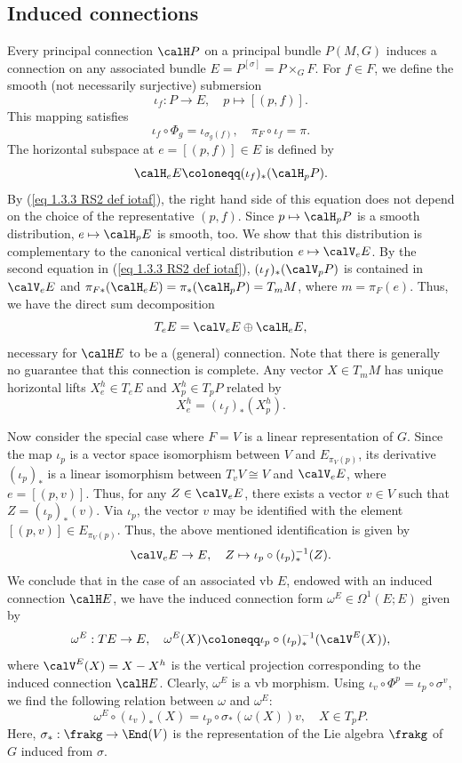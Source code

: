 \subsection{Induced connections}\label{sec: induced connections}


Every principal connection $\calH P$ on a principal bundle $P(M,G)$ induces a connection on any associated bundle $E=P^{[\sigma]}=P\times_G F$. For $f\in F$, we define the smooth (not necessarily surjective) submersion
\[\iota_f:P\to E,\quad p\mapsto [(p,f)].\label{eq 1.3.3 RS2 def iotaf}\]
This mapping satisfies 
\[\iota_f\circ \Phi_g=\iota_{\sigma_g(f)},\quad \pi_F\circ\iota_f=\pi.\]
The horizontal subspace at $e=[(p,f)]\in E$ is defined by
\[\calH_eE\coloneqq (\iota_f)_\ast (\calH_pP).\label{eq 1.3.4 RS2}\]
By (\ref{eq 1.3.3 RS2 def iotaf}), the right hand side of this equation does not depend on the choice of the representative $(p,f)$. Since $p\mapsto \calH_pP$ is a smooth distribution, $e\mapsto \calH_pE$ is smooth, too. We show that this distribution is complementary to the canonical vertical distribution $e\mapsto \calV_eE$. By the second equation in (\ref{eq 1.3.3 RS2 def iotaf}), $(\iota_f)_\ast(\calV_pP)$ is contained in $\calV_eE$ and $\pi_{F\ast}(\calH_eE)=\pi_\ast(\calH_pP)=T_mM$, where $m=\pi_F(e)$. Thus, we have the direct sum decomposition 
\[T_eE=\calV_eE\oplus \calH_eE,\]
necessary for $\calH E$ to be a (general) connection. Note that there is generally no guarantee that this connection is complete. Any vector $X\in T_mM$ has unique horizontal lifts $X_e^h\in T_eE$ and $X_p^h\in T_pP$ related by
\[X^h_e=(\iota_f)_\ast(X^h_p).\label{eq 1.3.5 RS2}\]

Now consider the special case where $F=V$ is a linear representation of $G$. Since the map $\iota_p$ is a vector space isomorphism between $V$ and $E_{\pi_V(p)}$, its derivative $(\iota_p)_\ast$ is a linear isomorphism between $T_vV\cong V$ and $\calV_eE$, where $e=[(p,v)]$. Thus, for any $Z\in \calV_eE$, there exists a vector $v\in V$ such that $Z=(\iota_p)_\ast(v)$. Via $\iota_p$, the vector $v$ may  be identified with the element $[(p,v)]\in E_{\pi_V(p)}$. Thus, the above mentioned identification is given by 
\[\calV_eE\to E,\quad Z\mapsto \iota_p\circ (\iota_p)_\ast^{-1}(Z).\]
We conclude that in the case of an associated \gls{vb} $E$, endowed with an induced connection $\calH E$, we have the induced connection form $\omega^E\in\Omega^1(E;E)$ given by
\[\omega^E:TE\to E,\quad \omega^E(X)\coloneqq \iota_p\circ (\iota_p)_\ast^{-1}(\calV^E(X)),\label{eq 1.3.9 RS2}\]
where $\calV^E(X)=X-X^h$ is the vertical projection corresponding to the induced connection $\calH E$. Clearly, $\omega^E$ is a \gls{vb} morphism. Using $\iota_v\circ \Phi^p=\iota_p\circ\sigma^v$, we find the following relation between $\omega$ and $\omega^E$:
\[\omega^E\circ (\iota_v)_\ast(X)=\iota_p\circ \sigma_{\ast}(\omega(X))v,\quad X\in T_pP.\]
Here, $\sigma_{\ast}:\frakg\to \End(V)$ is the representation of the Lie algebra $\frakg$ of $G$ induced from $\sigma$.

